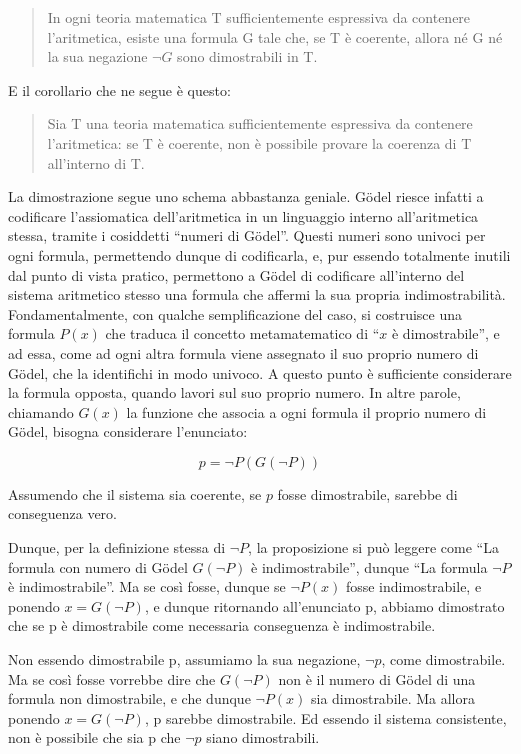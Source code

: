 \documentclass[a4paper,10pt]{article}
\begin{document}
\begin{quote}
  In ogni teoria matematica T sufficientemente espressiva da contenere l'aritmetica, esiste una formula G tale che, se T è coerente, allora né G né la sua negazione $\neg G$ sono dimostrabili in T.
\end{quote} 

E il corollario che ne segue è questo:
\begin{quotation}
  Sia T una teoria matematica sufficientemente espressiva da contenere l'aritmetica: se T è coerente, non è possibile provare la coerenza di T all'interno di T.
\end{quotation}

La dimostrazione segue uno schema abbastanza geniale. Gödel riesce infatti a codificare l'assiomatica dell'aritmetica in un linguaggio interno all'aritmetica stessa, tramite i cosiddetti “numeri di Gödel”.
Questi numeri sono univoci per ogni formula, permettendo dunque di codificarla, e, pur essendo totalmente inutili dal punto di vista pratico, permettono a Gödel di codificare all'interno del sistema aritmetico stesso una formula che affermi la sua propria indimostrabilità.
Fondamentalmente, con qualche semplificazione del caso, si costruisce una formula $P(x)$ che traduca il concetto metamatematico di “$x$ è dimostrabile”, e ad essa, come ad ogni altra formula viene assegnato il suo proprio numero di Gödel, che la identifichi in modo univoco.
A questo punto è sufficiente considerare la formula opposta, quando lavori sul suo proprio numero.
In altre parole, chiamando $G(x)$ la funzione che associa a ogni formula il proprio numero di Gödel, bisogna considerare l'enunciato:

$$
p = \neg P(G(\neg P))
$$

Assumendo che il sistema sia coerente, se $p$ fosse dimostrabile, sarebbe di conseguenza vero. 

Dunque, per la definizione stessa di $\neg P$, la proposizione si può leggere come “La formula con numero di Gödel $G(\neg P)$ è indimostrabile”, dunque “La formula $\neg P$ è indimostrabile”. Ma se così fosse, dunque se $\neg P(x)$ fosse indimostrabile, e ponendo $x = G(\neg P)$, e dunque ritornando all'enunciato p, abbiamo dimostrato che se p è dimostrabile come necessaria conseguenza è indimostrabile.

Non essendo dimostrabile p, assumiamo la sua negazione, $\neg p$, come dimostrabile. Ma se così fosse vorrebbe dire che $G(\neg P)$ non è il numero di Gödel di una formula non dimostrabile, e che dunque $\neg P(x)$ sia dimostrabile. Ma allora ponendo $x = G(\neg P)$, p sarebbe dimostrabile. Ed essendo il sistema consistente, non è possibile che sia p che $\neg p$ siano dimostrabili.
\end{document}
